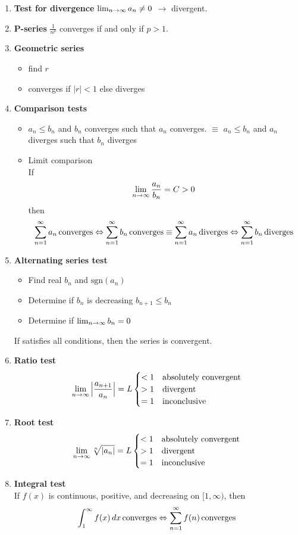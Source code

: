 \begin{enumerate}
  \item \textbf{Test for divergence} \(\lim_{n \to \infty} a_{n} \neq 0\) \(\to\) divergent.
  \item \textbf{P-series} \(\frac{1}{n^p}\) converges if and only if \(p > 1\).
  \item \textbf{Geometric series} 
    \begin{itemize}
      \item find \(r\)
      \item converges if \(|r| < 1\) else diverges
    \end{itemize}
  \item \textbf{Comparison tests}
    \begin{itemize}
      \item \(a_n \le b_n\) and \(b_n\) converges such that \(a_n\) converges. \(\equiv\) \(a_n \le b_n\) and \(a_n\) diverges such that \(b_n\) diverges
      \item Limit comparison \\
      If
      \[
        \lim_{n \to \infty} \frac{a_n}{b_n} = C > 0
      \]
      then
      \[
        \sum_{n=1}^{\infty} a_n \, \mathrm{converges} \Leftrightarrow \sum_{n=1}^{\infty} b_n \, \mathrm{converges} \equiv \sum_{n=1}^{\infty} a_n \, \mathrm{diverges} \Leftrightarrow \sum_{n=1}^{\infty} b_n \, \mathrm{diverges}
      \]
    \end{itemize}
  \item \textbf{Alternating series test}
    \begin{itemize}
      \item Find real \(b_n\) and \(\mathrm{sgn}{(a_n)}\)
      \item Determine if \(b_n\) is decreasing \(b_{n + 1} \le b_{n}\)
      \item Determine if \(\lim_{n \to \infty} b_n = 0\)
    \end{itemize}
    If satisfies all conditions, then the series is convergent.
  \item \textbf{Ratio test}
    \[
      \lim_{n \to \infty} \Big| \frac{a_{n+1}}{a_n} \Big| = L \begin{cases}
        < 1 & \text{absolutely convergent} \\
        > 1 & \text{divergent} \\
        = 1 & \text{inconclusive}
      \end{cases}
    \]
  \item \textbf{Root test}
    \[
      \lim_{n \to \infty} \sqrt[n]{|a_n|} = L \begin{cases}
        < 1 & \text{absolutely convergent} \\
        > 1 & \text{divergent} \\
        = 1 & \text{inconclusive}
      \end{cases}
    \]
  \item \textbf{Integral test} \\
  If \(f(x)\) is continuous, positive, and decreasing on \([1, \infty)\), then
  \[
    \int_{1}^{\infty} f(x) \, dx \, \mathrm{converges} \Leftrightarrow \sum_{n=1}^{\infty} f(n) \, \mathrm{converges}
  \]
\end{enumerate}
